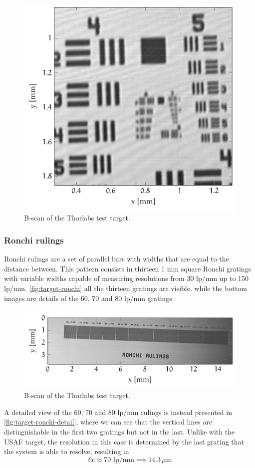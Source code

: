 \begin{figure}[hbt]
	\centering
	\includegraphics[width=0.6\linewidth]{gfx/ch4/axsun/target/usaf}
	\caption{B-scan of the Thorlabs test target.}\label{fig:target-usaf}
\end{figure}

\subsubsection{Ronchi rulings}
Ronchi rulings are a set of parallel bars with widths that are equal to the distance between. This pattern consists in thirteen 1 mm square Ronchi gratings with variable widths capable of measuring resolutions from 30 lp/mm up to 150 lp/mm. \autoref{fig:target-ronchi} all the thirteen gratings are visible. while the bottom images are details of the 60, 70 and 80 lp/mm gratings. 

\begin{figure}[hbt]
	\centering
	\includegraphics[width=1\linewidth]{gfx/ch4/axsun/target/ronchi-full}
	\caption{B-scan of the Thorlabs test target.}\label{fig:target-ronchi}
\end{figure}




A detailed view of the 60, 70 and 80 lp/mm rulings is instead presented in \autoref{fig:target-ronchi-detail}, where we can see that the vertical lines are distinguishable in the first two gratings but not in the last. Unlike with the USAF target, the resolution in this case is determined by the last grating that the system is able to resolve, resulting in
\begin{equation}
\delta x \approx 70 \text{ lp/mm} \implies 14.3\, \mu\text{m}
\end{equation}


